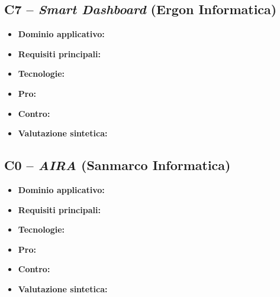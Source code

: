 \documentclass[12pt,a4paper]{article}
\begin{document}
\subsection{C7 -- \emph{Smart Dashboard} (Ergon Informatica)}
\begin{itemize}
\item \textbf{Dominio applicativo:} 
\item \textbf{Requisiti principali:} 
\item \textbf{Tecnologie:} 
\item \textbf{Pro:} 
\item \textbf{Contro:} 
\item \textbf{Valutazione sintetica:} 
\end{itemize}

\subsection{C0 -- \emph{AIRA} (Sanmarco Informatica)}
\begin{itemize}
\item \textbf{Dominio applicativo:} 
\item \textbf{Requisiti principali:} 
\item \textbf{Tecnologie:} 
\item \textbf{Pro:} 
\item \textbf{Contro:} 
\item \textbf{Valutazione sintetica:} 
\end{itemize}

\end{document}
